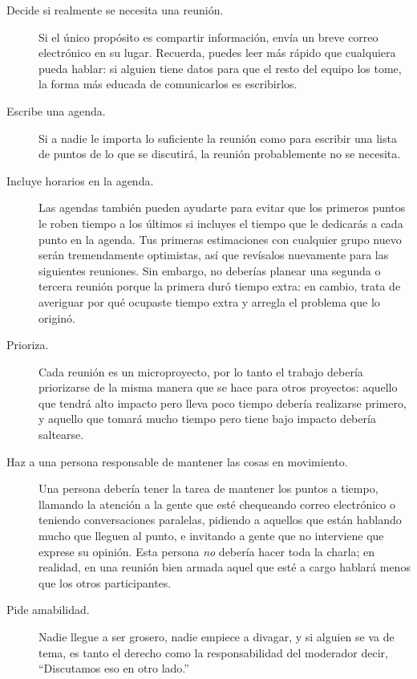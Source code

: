 \begin{description}

\item[Decide si realmente se necesita una reunión.]
  Si el único propósito es compartir información,
  envía un breve correo electrónico en su lugar.
  Recuerda,
  puedes leer más rápido que cualquiera pueda hablar:
  si alguien tiene datos para que el resto del equipo los tome,
  la forma más educada de comunicarlos es escribirlos.

\item[Escribe una agenda.]
  Si a nadie le importa lo suficiente la reunión como para escribir una lista de puntos
  de lo que se discutirá,
  la reunión probablemente no se necesita.

\item[Incluye horarios en la agenda.]
  Las agendas también pueden ayudarte para evitar que los primeros puntos le roben tiempo a los últimos
  si incluyes el tiempo que le dedicarás a cada punto en la agenda.
  Tus primeras estimaciones con cualquier grupo nuevo serán tremendamente optimistas,
  así que revísalos nuevamente para las siguientes reuniones.
  Sin embargo,
  no deberías planear una segunda o tercera reunión
  porque la primera duró tiempo extra:
  en cambio,
  trata de averiguar por qué ocupaste tiempo extra y arregla el problema que lo originó. 

\item[Prioriza.]
  Cada reunión es un microproyecto,
  por lo tanto el trabajo debería priorizarse de la misma manera que se hace para otros proyectos:
  aquello que tendrá alto impacto pero lleva poco tiempo debería realizarse primero,
  y aquello que tomará mucho tiempo pero tiene bajo impacto debería saltearse.

\item[Haz a una persona responsable de mantener las cosas en movimiento.]
  Una persona debería tener la tarea de mantener los puntos a tiempo,
  llamando la atención a la gente que esté chequeando correo electrónico o  teniendo  conversaciones paralelas,
  pidiendo a aquellos que están hablando mucho que lleguen al punto,
  e invitando a gente que no interviene que exprese su opinión.
  Esta persona \emph{no} debería hacer toda la charla;
  en realidad, 
  en una reunión bien armada aquel que esté a cargo hablará menos 
  que los otros participantes.

\item[Pide amabilidad.]
  Nadie llegue a ser grosero,
  nadie empiece a divagar,
  y si alguien se va de tema,
  es tanto el derecho como la responsabilidad del moderador decir,
  ``Discutamos eso en otro lado.''


\end{description}
